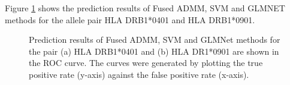 \documentclass[conference,10pt,draftclsnofoot,onecolumn]{IEEEtran}
\begin{document}
Figure \ref{fig:roc} shows the prediction results of Fused ADMM, SVM and GLMNET methods for the allele pair HLA DRB1*0401 and HLA DRB1*0901.

\begin{figure}
    \centering
    \caption{Prediction results of Fused ADMM, SVM and GLMNet methods for the pair (a) HLA DRB1*0401 and (b) HLA DR1*0901 are shown in the ROC curve. The curves were generated by plotting the true positive rate (y-axis) against the false positive rate (x-axis).}
    \label{fig:roc}
\end{figure}
\end{document}
